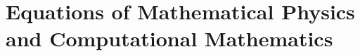 \documentclass[../../book-en.tex]{subfiles}
\begin{document}
\chapter{Equations of Mathematical Physics and Computational Mathematics}
\label{ch:2.1-mathphys-numerical-en}
















\end{document}
